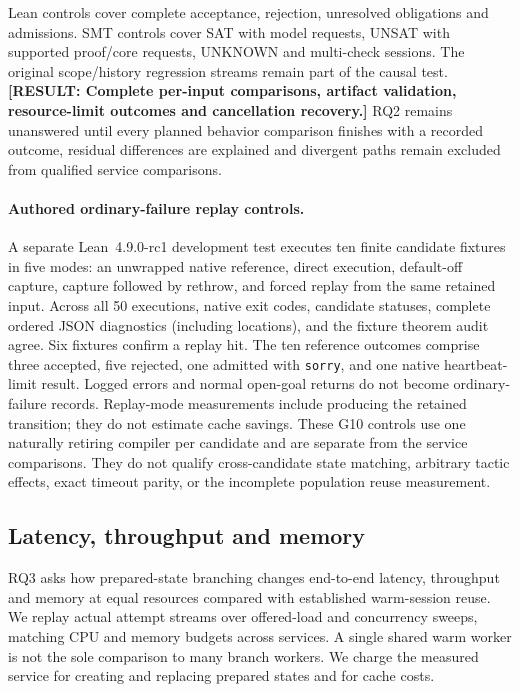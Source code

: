 \documentclass[10pt,twocolumn]{article}
\newcommand{\missing}[1]{\textbf{[RESULT: #1]}}
\begin{document}
Lean controls cover complete acceptance, rejection, unresolved obligations and admissions. SMT controls cover SAT with model requests, UNSAT with supported proof/core requests, UNKNOWN and multi-check sessions. The original scope/history regression streams remain part of the causal test. \missing{Complete per-input comparisons, artifact validation, resource-limit outcomes and cancellation recovery.} RQ2 remains unanswered until every planned behavior comparison finishes with a recorded outcome, residual differences are explained and divergent paths remain excluded from qualified service comparisons.

\paragraph{Authored ordinary-failure replay controls.}
A separate Lean~4.9.0-rc1 development test executes ten finite candidate
fixtures in five modes: an unwrapped native reference, direct execution,
default-off capture, capture followed by rethrow, and forced replay from the
same retained input. Across all 50 executions, native exit codes, candidate
statuses, complete ordered JSON diagnostics (including locations), and the
fixture theorem audit agree. Six fixtures confirm a replay hit. The ten
reference outcomes comprise three accepted, five rejected, one admitted
with \texttt{sorry}, and one native heartbeat-limit result.
Logged errors and normal open-goal returns do not become ordinary-failure
records. Replay-mode measurements include producing the retained transition;
they do not estimate cache savings. These G10 controls use one naturally
retiring compiler per candidate and are separate from the service comparisons.
They do not qualify cross-candidate state matching, arbitrary tactic effects,
exact timeout parity, or the incomplete population reuse measurement.

\subsection{Latency, throughput and memory}\label{sec:service-results}
RQ3 asks how prepared-state branching changes end-to-end latency, throughput and memory at equal resources compared with established warm-session reuse. We replay actual attempt streams over offered-load and concurrency sweeps, matching CPU and memory budgets across services. A single shared warm worker is not the sole comparison to many branch workers. We charge the measured service for creating and replacing prepared states and for cache costs.
\end{document}
